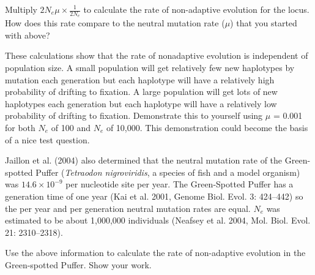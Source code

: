 \documentclass[11pt, addpoints, hidelinks]{exam}
\begin{document}
\begin{questions}
\ifprintanswers{}
\else
\fi

\question
Multiply $2N_e\mu \times \frac{1}{2N_e}$ to calculate the rate of non-adaptive evolution for the locus. How does this rate compare to the neutral mutation rate ($\mu$) that you started with above?

\ifprintanswers{}	
\else
\fi

\newpage

These calculations show that the rate of nonadaptive evolution is independent of population size. A small population will get relatively few new haplotypes by mutation each generation but each haplotype will have a relatively high probability of drifting to fixation. A large population will get lots of new haplotypes each generation but each haplotype will have a relatively low probability of drifting to fixation. Demonstrate this to yourself using $\mu$ = 0.001 for both $N_e$ of 100 and $N_e$ of 10,000. This demonstration could become the basis of a nice test question.

Jaillon et al. (2004) also determined that the neutral mutation rate of the Green-spotted Puffer (\textit{Tetraodon nigroviridis}, a species of fish and a model organism) was $14.6 \times 10^{-9}$ per nucleotide site per year. The Green-Spotted Puffer has a generation time of one year (Kai et al. 2001, Genome Biol. Evol. 3: 424--442) so the per year and per generation neutral mutation rates are equal. $N_e$ was estimated to be about 1,000,000 individuals (Neafsey et al. 2004, Mol. Biol. Evol. 21: 2310--2318).

\question[4]
Use the above information to calculate the rate of non-adaptive evolution in the Green-spotted Puffer. Show your work.

\ifprintanswers{}
\end{questions}
\end{document}
